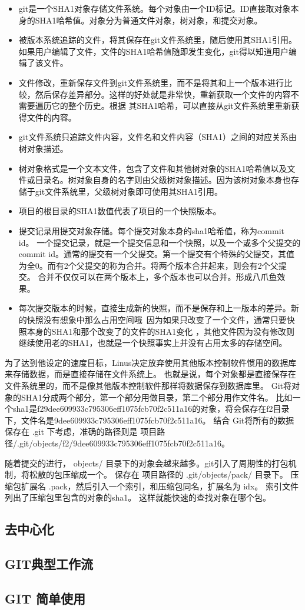 \begin{itemize}
\item git是一个SHA1对象存储文件系统。每个对象由一个ID标记。ID直接取对象本身的SHA1哈希值。对象分为普通文件对象，树对象，和提交对象。
\item 被版本系统追踪的文件，将其保存在git文件系统里，随后使用其SHA1引用。如果用户编辑了文件，文件的SHA1哈希值随即发生变化，git得以知道用户编辑了该文件。
\item 文件修改，重新保存文件到git文件系统里，而不是将其和上一个版本进行比较，然后保存差异部分。这样的好处就是非常快，重新获取一个文件的内容不需要遍历它的整个历史。根据 其SHA1哈希，可以直接从git文件系统里重新获得文件的内容。
\item git文件系统只追踪文件内容，文件名和文件内容（SHA1）之间的对应关系由树对象描述。
\item 树对象格式是一个文本文件，包含了文件和其他树对象的SHA1哈希值以及文件或目录名。树对象自身的名字则由父级树对象描述。因为该树对象本身也存储于git文件系统里，父级树对象即可使用其SHA1引用。

\item 项目的根目录的SHA1数值代表了项目的一个快照版本。
\item 提交记录用提交对象存储。每个提交对象本身的sha1哈希值，称为commit id。 一个提交记录，就是一个提交信息和一个快照，以及一个或多个父提交的commit id。通常的提交有一个父提交。第一个提交有个特殊的父提交，其值为全0。而有2个父提交的称为合并。将两个版本合并起来，则会有2个父提交。
合并不仅仅可以在两个版本上，多个版本也可以合并。形成八爪鱼效果。
\item 每次提交版本的时候，直接生成新的快照，而不是保存和上一版本的差异。新的快照没有想象中那么占用空间哦~因为如果只改变了一个文件，通常只要快照本身的SHA1和那个改变了的文件的SHA1变化 ，其他文件因为没有修改则继续使用老的SHA1，也就是一个快照事实上并没有占用太多的存储空间。

\end{itemize}

为了达到他设定的速度目标，Linus决定放弃使用其他版本控制软件惯用的数据库来存储数据，而是直接存储在文件系统上。
也就是说，每个对象都是直接保存在文件系统里的，而不是像其他版本控制软件那样将数据保存到数据库里。
Git将对象的SHA1分成两个部分，第一个部分用做目录，第二个部分用作文件名。
比如一个sha1是f29dee609933c795306eff1075fcb70f2c511a16的对象，将会保存在f2目录下，文件名是9dee609933c795306eff1075fcb70f2c511a16。
结合 Git将所有的数据保存在 .git 下考虑，准确的路径则是 项目路径/.git/objects/f2/9dee609933c795306eff1075fcb70f2c511a16。

随着提交的进行， objects/ 目录下的对象会越来越多。git引入了周期性的打包机制，将松散的包压缩成一个。
保存在 项目路径的 .git/objects/pack/ 目录下。
压缩包扩展名 .pack，然后引入一个索引，和压缩包同名，扩展名为 idx。
索引文件列出了压缩包里包含的对象的sha1。
这样就能快速的查找对象在哪个包。

\subsection{去中心化}
\subsection{GIT典型工作流}
\subsection{GIT 简单使用}



